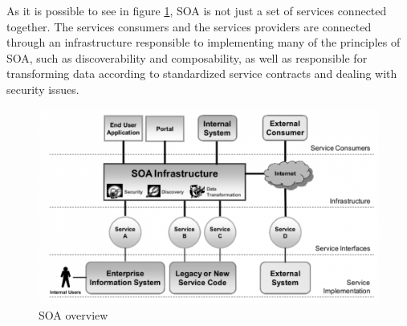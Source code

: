 As it is possible to see in figure \ref{fig:estilo-SOA}, \acrshort{SOA} is not just a set of services connected together. The services consumers and the services providers are connected through an infrastructure responsible to implementing many of the principles of \acrshort{SOA}, such as discoverability and composability, as well as responsible for transforming data according to standardized service contracts and dealing with security issues.

\begin{figure}[ht]
\centering
\includegraphics[width=0.8\linewidth]{images/SOA_GRAY.png}
\caption{SOA overview}
\label{fig:estilo-SOA}
\end{figure}
